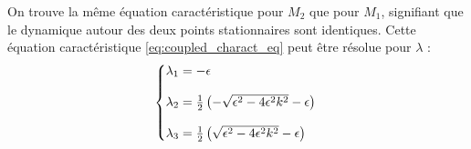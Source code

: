 %
On trouve la même équation caractéristique pour $M_2$ que pour $M_1$, signifiant que le dynamique autour des
deux points stationnaires sont identiques. Cette équation caractéristique \eqref{eq:coupled_charact_eq} peut être résolue pour $\lambda$ :
%
\begin{equation}
  \left\{\begin{array}{@{}l@{}}
    \lambda_1 = -\epsilon \\
    \\
    \lambda_2 = \frac{1}{2}\left(  -\sqrt{\epsilon^2 - 4\epsilon^2k^2} - \epsilon \right) \\
    \\
    \lambda_3 = \frac{1}{2}\left( \sqrt{\epsilon^2 - 4\epsilon^2k^2} - \epsilon \right)
  \end{array}\right.\,
\end{equation}
%
